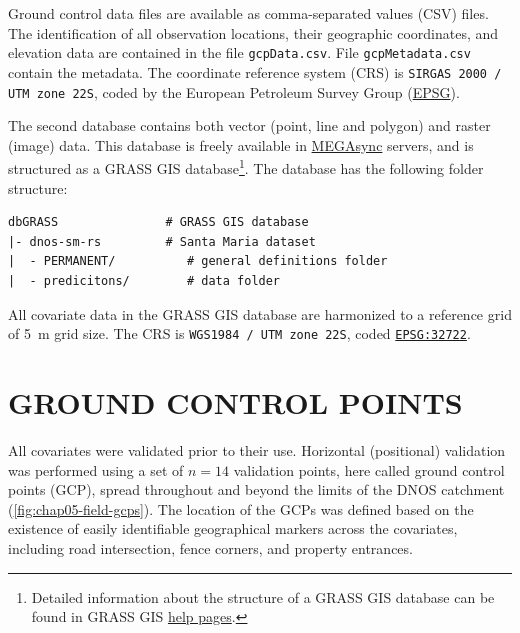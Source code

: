 Ground control data files are available as comma-separated values (CSV) files. The identification of all 
observation locations, their geographic coordinates, and elevation data are contained in the file 
\texttt{gcpData.csv}. File \texttt{gcpMetadata.csv} contain the metadata. The coordinate reference system 
(CRS) is \texttt{SIRGAS 2000 / UTM zone 22S}, coded \sirgas{} by the European Petroleum Survey Group 
(\href{http://www.epsg.org/}{EPSG}).

\def\megasync{\href{https://mega.nz/\#F!aY5CRQqY}{MEGAsync}}

\def\footgrass{\footnote{Detailed information about the structure of a GRASS GIS database can be found in 
GRASS GIS \href{https://grass.osgeo.org/grass64/manuals/helptext.html}{help pages}.}}

The second database contains both vector (point, line and polygon) and raster (image) data. This database is 
freely available in \megasync{} servers, and is structured as a GRASS GIS database\footgrass{}. The database 
has the following folder structure:

\begin{verbatim}
dbGRASS               # GRASS GIS database
|- dnos-sm-rs         # Santa Maria dataset
|  - PERMANENT/          # general definitions folder
|  - predicitons/        # data folder
\end{verbatim}

\def\wgs{\href{http://spatialreference.org/ref/epsg/32722/}{\texttt{EPSG:32722}}}

All covariate data in the GRASS GIS database are harmonized to a reference grid of \SI{5}{\m} grid size. The 
CRS is \texttt{WGS1984 / UTM zone 22S}, coded \wgs{}.

\section{GROUND CONTROL POINTS}
\label{sec:chap05-gcp}

All covariates were validated prior to their use. Horizontal (positional) validation was performed using a set
of $n = 14$ validation points, here called ground control points (GCP), spread throughout and beyond the 
limits of the DNOS catchment (\autoref{fig:chap05-field-gcps}). The location of the GCPs was defined based on 
the existence of easily identifiable geographical markers across the covariates, including road intersection, 
fence corners, and property entrances.

